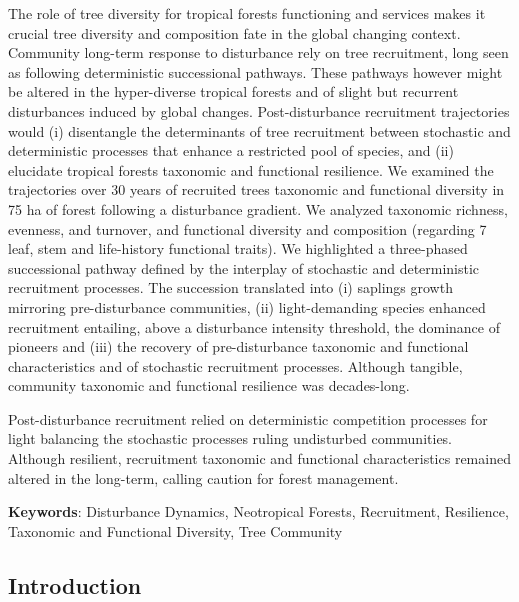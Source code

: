 \documentclass[
  11pt,
  french,
  A4paper,
  extrafontsizes,onecolumn,openright
  ]{memoir}
\begin{document}
The role of tree diversity for tropical forests functioning and services
makes it crucial tree diversity and composition fate in the global
changing context. Community long-term response to disturbance rely on
tree recruitment, long seen as following deterministic successional
pathways. These pathways however might be altered in the hyper-diverse
tropical forests and of slight but recurrent disturbances induced by
global changes. Post-disturbance recruitment trajectories would (i)
disentangle the determinants of tree recruitment between stochastic and
deterministic processes that enhance a restricted pool of species, and
(ii) elucidate tropical forests taxonomic and functional resilience. We
examined the trajectories over 30 years of recruited trees taxonomic and
functional diversity in 75 ha of forest following a disturbance
gradient. We analyzed taxonomic richness, evenness, and turnover, and
functional diversity and composition (regarding 7 leaf, stem and
life-history functional traits). We highlighted a three-phased
successional pathway defined by the interplay of stochastic and
deterministic recruitment processes. The succession translated into (i)
saplings growth mirroring pre-disturbance communities, (ii)
light-demanding species enhanced recruitment entailing, above a
disturbance intensity threshold, the dominance of pioneers and (iii) the
recovery of pre-disturbance taxonomic and functional characteristics and
of stochastic recruitment processes. Although tangible, community
taxonomic and functional resilience was decades-long.

Post-disturbance recruitment relied on deterministic competition
processes for light balancing the stochastic processes ruling
undisturbed communities. Although resilient, recruitment taxonomic and
functional characteristics remained altered in the long-term, calling
caution for forest management.

\textbf{Keywords}: Disturbance Dynamics, Neotropical Forests,
Recruitment, Resilience, Taxonomic and Functional Diversity, Tree
Community

\subsection{Introduction}\label{introduction-2}
\end{document}
